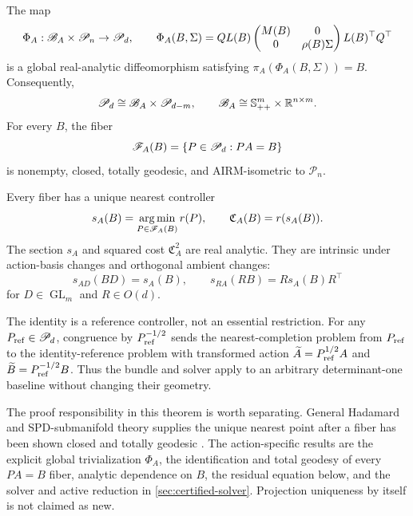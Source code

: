 \begin{theorem}
\label{thm:action-bundle}
The map
\begin{equation}
  \Phi_A:\mathscr B_A\times\mathscr P_n\to\mathscr P_d,
  \qquad
  \Phi_A(B,\Sigma)
  =QL(B)
  \begin{pmatrix}M(B)&0\\0&\rho(B)\Sigma\end{pmatrix}
  L(B)^\top Q^\top
  \label{eq:action-bundle-map}
\end{equation}
is a global real-analytic diffeomorphism satisfying
\(\pi_A(\Phi_A(B,\Sigma))=B\).  Consequently,
\begin{equation}
  \mathscr P_d\cong\mathscr B_A\times\mathscr P_{d-m},
  \qquad
  \mathscr B_A\cong\mathbb{S}_{++}^m\times\mathbb R^{n\times m}.
  \label{eq:global-action-product}
\end{equation}
For every \(B\), the fiber
\[
  \mathscr F_A(B)=\{P\in\mathscr P_d:PA=B\}
\]
is nonempty, closed, totally geodesic, and AIRM-isometric to
\(\mathscr P_n\).

Every fiber has a unique nearest controller
\begin{equation}
  s_A(B)=\operatorname*{arg\,min}_{P\in\mathscr F_A(B)}r(P),
  \qquad
  \mathfrak C_A(B)=r(s_A(B)).
  \label{eq:canonical-controller}
\end{equation}
The section \(s_A\) and squared cost \(\mathfrak C_A^2\) are real analytic.
They are intrinsic under action-basis changes and orthogonal ambient changes:
\begin{equation}
  s_{AD}(BD)=s_A(B),
  \qquad
  s_{RA}(RB)=R s_A(B)R^\top
  \label{eq:controller-equivariance}
\end{equation}
for \(D\in\operatorname{GL}_m\) and \(R\in O(d)\).
\end{theorem}

The identity is a reference controller, not an essential restriction.  For
any \(P_{\rm ref}\in\mathscr P_d\), congruence by \(P_{\rm ref}^{-1/2}\) sends the
nearest-completion problem from \(P_{\rm ref}\) to the identity-reference
problem with transformed action
\(\widetilde A=P_{\rm ref}^{1/2}A\) and
\(\widetilde B=P_{\rm ref}^{-1/2}B\).  Thus the bundle and solver apply to an
arbitrary determinant-one baseline without changing their geometry.

The proof responsibility in this theorem is worth separating.  General
Hadamard and SPD-submanifold theory supplies the unique nearest point after a
fiber has been shown closed and totally geodesic
\cite{lim2004best,tumpach2024totally}.  The action-specific results are the
explicit global trivialization \(\Phi_A\), the identification and total
geodesy of every \(PA=B\) fiber, analytic dependence on \(B\), the residual
equation below, and the solver and active reduction in
\cref{sec:certified-solver}.  Projection uniqueness by itself is not claimed
as new.


